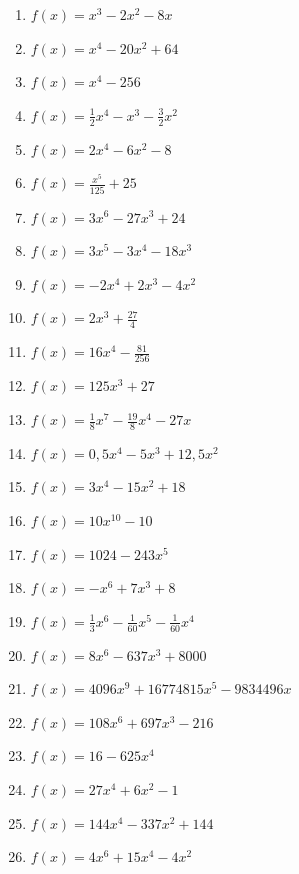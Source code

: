 \begin{Exercise}[title={Berechne die Nullstellen}, label=ganzNSTA1]
	\begin{minipage}{\textwidth}
		\begin{minipage}{0.5\textwidth}
			\begin{enumerate}[label=\alph*)]
				\item \(f(x)=x^3-2x^2-8x\)
				\item \(f(x)=x^4-20x^2+64\)
				\item \(f(x)=x^4-256\)
				\item \(f(x)=\frac{1}{2}x^4-x^3-\frac{3}{2}x^2\)
				\item \(f(x)=2x^4-6x^2-8\)
				\item \(f(x)=\frac{x^5}{125}+25\)
				\item \(f(x)=3x^6-27x^3+24\)
				\item \(f(x)=3x^5-3x^4-18x^3\)
				\item \(f(x)=-2x^4+2x^3-4x^2\)
				\item \(f(x)=2x^3+\frac{27}{4}\)
				\item \(f(x)=16x^4-\frac{81}{256}\)
				\item \(f(x)=125x^3+27\)
				\item \(f(x)=\frac{1}{8}x^7-\frac{19}{8}x^4-27x\)
			\end{enumerate}
		\end{minipage}%
		\begin{minipage}{0.5\textwidth}
			\begin{enumerate}[label=\alph*)]
				\setcounter{enumi}{13}
				\item \(f(x)=0,5x^4-5x^3+12,5x^2\)
				\item \(f(x)=3x^4-15x^2+18\)
				\item \(f(x)=10x^{10}-10\)
				\item \(f(x)=1024-243x^5\)
				\item \(f(x)=-x^6+7x^3+8\)
				\item \(f(x)=\frac{1}{3}x^6-\frac{1}{60}x^5-\frac{1}{60}x^4\)
				\item \(f(x)=8x^6-637x^3+8000\)
				\item \(f(x)=4096x^9+16774815x^5-9834496x\)
				\item \(f(x)=108x^6+697x^3-216\)
				\item \(f(x)=16-625x^4\)
				\item \(f(x)=27x^4+6x^2-1\)
				\item \(f(x)=144x^4-337x^2+144\)
				\item \(f(x)=4x^6+15x^4-4x^2\)
			\end{enumerate}
		\end{minipage}%
	\end{minipage}
\end{Exercise}
